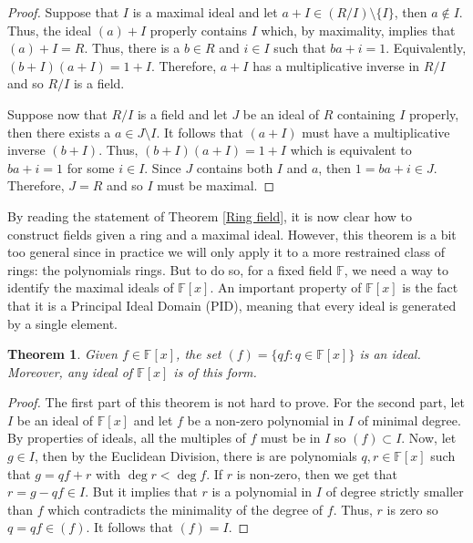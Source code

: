\documentclass{article}
\theoremstyle{plain}
\newtheorem{theorem}{Theorem}[subsection]
\theoremstyle{definition}
\newcommand{\F}{\mathbb{F}}
\begin{document}
\begin{proof}
    Suppose that $I$ is a maximal ideal and let $a + I \in (R/I)\setminus \{I\}$, then $a \notin I$. Thus, the ideal $(a) + I$ properly contains $I$ which, by maximality, implies that $(a) + I = R$. Thus, there is a $b \in R$ and $i \in I$ such that $ba + i = 1$. Equivalently, $(b + I)(a + I) = 1 + I$. Therefore, $a+I$ has a multiplicative inverse in $R/I$ and so $R/I$ is a field.
    
    Suppose now that $R/I$ is a field and let $J$ be an ideal of $R$ containing $I$ properly, then there exists a $a \in J\setminus I$. It follows that $(a + I)$ must have a multiplicative inverse $(b+I)$. Thus, $(b+I)(a+I) = 1+I$ which is equivalent to $ba + i = 1$ for some $i \in I$. Since $J$ contains both $I$ and $a$, then $1 = ba + i \in J$. Therefore, $J = R$ and so $I$ must be maximal. 
\end{proof}

By reading the statement of Theorem \ref{Ring field}, it is now clear how to construct fields given a ring and a maximal ideal. However, this theorem is a bit too general since in practice we will only apply it to a more restrained class of rings: the polynomials rings. But to do so, for a fixed field $\F$, we need a way to identify the maximal ideals of $\F[x]$. An important property of $\F[x]$ is the fact that it is a Principal Ideal Domain (PID), meaning that every ideal is generated by a single element.

\begin{theorem}
\label{PID}
    Given $f \in \F[x]$, the set $(f) = \{qf : q \in \F[x]\}$ is an ideal. Moreover, any ideal of $\F[x]$ is of this form.
\end{theorem}

\begin{proof}
    The first part of this theorem is not hard to prove. For the second part, let $I$ be an ideal of $\F[x]$ and let $f$ be a non-zero polynomial in $I$ of minimal degree. By properties of ideals, all the multiples of $f$ must be in $I$ so $(f) \subset I$. Now, let $g \in I$, then by the Euclidean Division, there is are polynomials $q,r \in \F[x]$ such that $g = qf + r$ with $\deg r < \deg f$. If $r$ is non-zero, then we get that $r = g - qf \in I$. But it implies that $r$ is a polynomial in $I$ of degree strictly smaller than $f$ which contradicts the minimality of the degree of $f$. Thus, $r$ is zero so $q = qf \in (f)$. It follows that $(f) = I$.
\end{proof}
\end{document}
